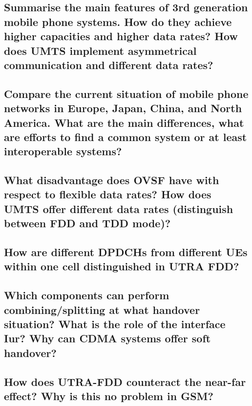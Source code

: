 \subsection{Summarise the main features of 3rd generation mobile phone systems. How do they
achieve higher capacities and higher data rates? How does UMTS implement
asymmetrical communication and different data rates?}

\subsection{Compare the current situation of mobile phone networks in Europe, Japan, China,
and North America. What are the main differences, what are efforts to find a common
system or at least interoperable systems?}

\subsection{What disadvantage does OVSF have with respect to flexible data rates? How does
UMTS offer different data rates (distinguish between FDD and TDD mode)?}

\subsection{How are different DPDCHs from different UEs within one cell distinguished in UTRA
FDD?}

\subsection{Which components can perform combining/splitting at what handover situation? What
is the role of the interface Iur? Why can CDMA systems offer soft handover?}

\subsection{How does UTRA-FDD counteract the near-far effect? Why is this no problem in
GSM?}


